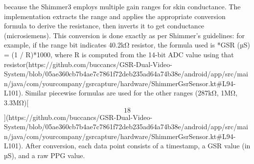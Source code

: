 \documentclass[12pt,a4paper]{article}
\begin{document}
{because the Shimmer3 employs multiple gain ranges for skin conductance.
The implementation extracts the range and applies the appropriate
conversion formula to derive the resistance, then inverts it to get
conductance (microsiemens). This conversion is done exactly as per
Shimmer's guidelines: for example, if the range bit indicates 40.2kΩ
resistor, the formula used is *GSR (µS) = (1 / R)*1000, where R is
computed from the 14-bit ADC value using that
resistor\*[\[18\]](https://github.com/buccancs/GSR-Dual-Video-System/blob/05ae360cb7b4ae7c7861f72deb235ad64a74b38e/android/app/src/main/java/com/yourcompany/gsrcapture/hardware/ShimmerGsrSensor.kt#L94-L101).
Similar piecewise formulas are used for the other ranges (287kΩ, 1MΩ,
3.3MΩ)[\[18\]](https://github.com/buccancs/GSR-Dual-Video-System/blob/05ae360cb7b4ae7c7861f72deb235ad64a74b38e/android/app/src/main/java/com/yourcompany/gsrcapture/hardware/ShimmerGsrSensor.kt#L94-L101).
After conversion, each data point consists of a timestamp, a GSR value
(in µS), and a raw PPG value.

}
\end{document}

